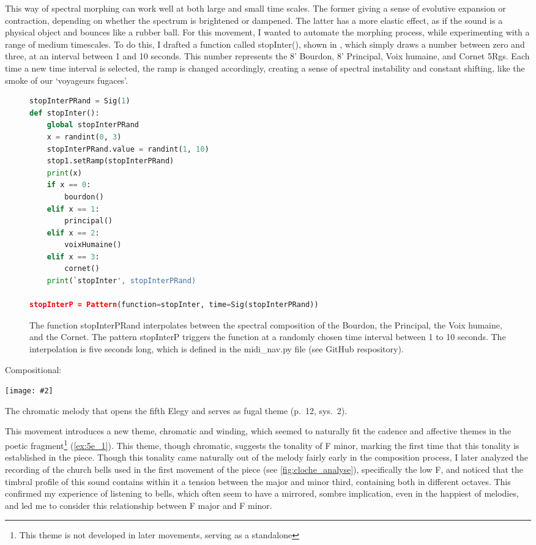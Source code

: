 \documentclass[12pt,twoside,maitrise]{dms_ks}
\newcommand{\customincludeexamples}[4][]{%
    \begin{example}[H]
        \centering
        \texttt{[image: \#2]}
        \caption{#4}
	\label{#3} 
    \end{example}
}
\theoremstyle{definition}
\begin{document}
{This way of spectral morphing can work well at both large and small time scales.
The former giving a sense of evolutive expansion or contraction, depending on whether the spectrum is brightened or dampened.
The latter has a more elastic effect, as if the sound is a physical object and bounces like a rubber ball.
For this movement, I wanted to automate the morphing process, while experimenting with a range of medium timescales.
To do this, I drafted a function called stopInter(), shown in , which simply draws a number between zero and three, at an interval between 1 and 10 seconds.
This number represents the 8' Bourdon, 8' Principal, Voix humaine, and Cornet 5Rgs.
Each time a new time interval is selected, the ramp is changed accordingly, creating a sense of spectral instability and constant shifting, like the smoke of our `voyageurs fugaces'.
\begin{figure}[H]
\begin{lstlisting}[language=Python]
stopInterPRand = Sig(1)
def stopInter():
    global stopInterPRand
    x = randint(0, 3)
    stopInterPRand.value = randint(1, 10)
    stop1.setRamp(stopInterPRand)
    print(x)
    if x == 0:
        bourdon()
    elif x == 1:
        principal()
    elif x == 2:
        voixHumaine()
    elif x == 3:
        cornet()
    print(`stopInter', stopInterPRand)

stopInterP = Pattern(function=stopInter, time=Sig(stopInterPRand))
\end{lstlisting}
\caption{The function stopInterPRand interpolates between the spectral composition of the Bourdon, the Principal, the Voix humaine, and the Cornet. The pattern stopInterP triggers the function at a randomly chosen time interval between 1 to 10 seconds. The interpolation is five seconds long, which is defined in the midi\_nav.py file (see GitHub respository).}
\label{fig:stopinter}
\end{figure}

Compositional:

\customincludeexamples[width=\textwidth]{5e_1}{ex:5e_1}{The chromatic melody that opens the fifth Elegy and serves as fugal theme (p.~12, sys.~2).}

This movement introduces a new theme, chromatic and winding, which seemed to naturally fit the cadence and affective themes in the poetic fragment\footnote{This theme is not developed in later movements, serving as a standalone} (\cref{ex:5e_1}).
This theme, though chromatic, suggests the tonality of F minor, marking the first time that this tonality is established in the piece.
Though this tonality came naturally out of the melody fairly early in the composition process, I later analyzed the recording of the church bells used in the first movement of the piece (see \cref{fig:cloche_analyse}), specifically the low F, and noticed that the timbral profile of this sound contains within it a tension between the major and minor third, containing both in different octaves.
This confirmed my experience of listening to bells, which often seem to have a mirrored, sombre implication, even in the happiest of melodies, and led me to consider this relationship between F major and F minor. 

}
\end{document}

